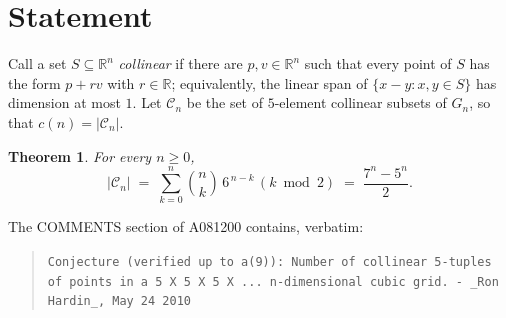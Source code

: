 \documentclass[11pt]{amsart}
\theoremstyle{plain}
\newtheorem{theorem}{Theorem}
\theoremstyle{definition}
\newcommand{\R}{\mathbb{R}}
\begin{document}
\section{Statement}\label{sec:statement}

Call a set $S\subseteq\R^n$ \emph{collinear} if there are $p,v\in\R^n$ such that every point of $S$ has the form $p+rv$ with $r\in\R$; equivalently, the linear span of $\{x-y: x,y\in S\}$ has dimension at most $1$.
Let $\mathcal C_n$ be the set of $5$-element collinear subsets of $G_n$, so that $c(n)=|\mathcal C_n|$.

\begin{theorem}\label{thm:main}
For every $n\ge0$,
\[
  |\mathcal C_n| \;=\; \sum_{k=0}^{n}\binom nk\,6^{\,n-k}\,(k\bmod 2)\;=\;\frac{7^n-5^n}{2}.
\]
\end{theorem}

The COMMENTS section of A081200 \cite{A081200} contains, verbatim:
\begin{quote}
{\small\raggedright\texttt{Conjecture (verified up to a(9)): Number of collinear 5-tuples of points in a 5 X 5 X 5 X ... n-dimensional cubic grid. - \_Ron Hardin\_, May 24 2010}\par}
\end{quote}
\end{document}
